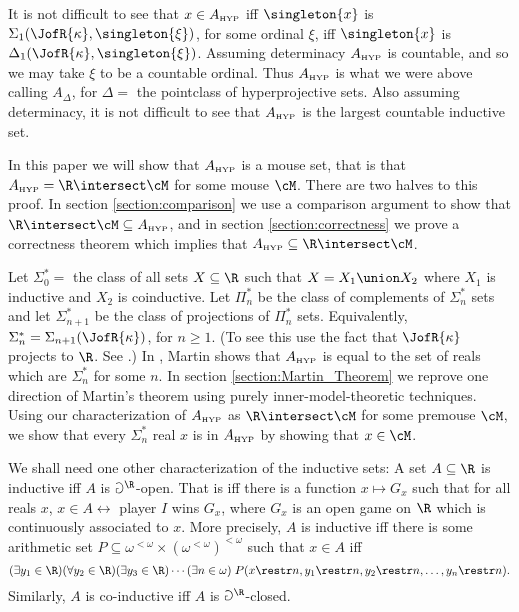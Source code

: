 It is not difficult to see that $x\in A_{\mbox{\tiny HYP}}$ iff
 $\singleton{x}$ is $\Sigma_1(\JofR{\kappa},\singleton{\xi})$, for some
ordinal $\xi$, iff
 $\singleton{x}$
is $\Delta_1(\JofR{\kappa},\singleton{\xi})$.
 Assuming determinacy  $A_{\mbox{\tiny HYP}}$ is countable,
and so we may take $\xi$ to be a countable ordinal. Thus
$A_{\mbox{\tiny HYP}}$ is what we were above calling $A_{\Delta}$, for
$\Delta = $ the pointclass of hyperprojective sets. Also assuming
determinacy, it is not difficult to see that $A_{\mbox{\tiny HYP}}$ is the
largest countable inductive set.

In this paper we will show that $A_{\mbox{\tiny HYP}}$ is a mouse set, that is that
$\Ahyp=\R\intersect\cM$ for some mouse $\cM$. There are
two halves to this proof. In section \ref{section:comparison} we use
a comparison argument to show that $\R\intersect\cM\subseteq\Ahyp$,
and in section \ref{section:correctness} we prove a correctness
theorem which implies that $\Ahyp\subseteq\R\intersect\cM$.

Let $\Sigma^*_0 =$ the class of all sets $X\subseteq\R$ such that
$X=X_1\union X_2$ where $X_1$ is inductive and $X_2$ is coinductive.
 Let $\Pi^*_n$ be the class of complements of $\Sigma^*_n$ sets
and let $\Sigma^*_{n+1}$ be the class of projections of $\Pi^*_n$ sets.
Equivalently,  $\Sigma^*_n=\Sigma_{n+1}(\JofR{\kappa})$, for $n\geq 1$.
(To see this use the fact that $\JofR{\kappa}$ projects to $\R$.
See \cite{Scales_In_LofR}.) In \cite{Largest_This_That}, Martin
shows that $A_{\mbox{\tiny HYP}}$ is equal to the set of reals which are
$\Sigma^*_n$ for some $n$. In section \ref{section:Martin_Theorem}
we reprove one direction of Martin's theorem using
purely inner-model-theoretic techniques. Using our characterization
of $A_{\mbox{\tiny HYP}}$ as $\R\intersect\cM$ for some premouse $\cM$, we show that
every $\Sigma^*_n$ real $x$ is in $A_{\mbox{\tiny HYP}}$ by showing that $x\in\cM$.

We shall need one other characterization of the inductive sets: A set
$A\subseteq\R$ is inductive iff $A$ is $\Game^{\R}$-open.  That is
iff there is a function $x\mapsto G_x$ such that for all reals $x$,
$x\in A \leftrightarrow $ player $I$ wins $G_x$, where $G_x$ is
an open game on $\R$ which is continuously associated to  $x$.
More precisely, $A$ is inductive
iff there is some arithmetic set
$P\subseteq \omega^{<\omega}\times(\omega^{<\omega})^{<\omega}$ such
that $x\in A$ iff
$$(\exists y_1\in\R) (\forall y_2\in\R) (\exists y_3\in\R)
\cdots (\exists n\in\omega) \;
P(x\restr n, y_1\restr n, y_2\restr n,\dots, y_n\restr n).$$
Similarly, $A$ is co-inductive iff $A$ is $\Game^{\R}$-closed.

